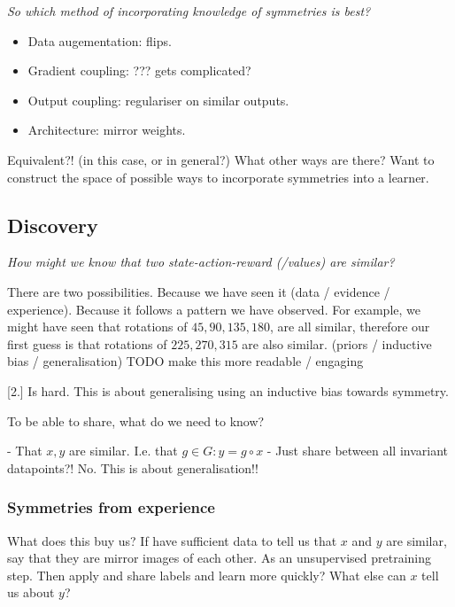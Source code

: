 \begin{displayquote}
\textit{So which method of incorporating knowledge of symmetries is best?}
\end{displayquote}

\begin{itemize}
\tightlist
  \item Data augementation: flips.
  \item Gradient coupling: ??? gets complicated?
  \item Output coupling: regulariser on similar outputs.
  \item Architecture: mirror weights.
\end{itemize}

Equivalent?! (in this case, or in general?)
What other ways are there? Want to construct the space of possible ways to incorporate symmetries into a learner.

\subsection{Discovery}

\begin{displayquote}
\textit{How might we know that two state-action-reward (/values) are similar?}
\end{displayquote}

There are two possibilities. Because we have seen it (data / evidence / experience).
Because it follows a pattern we have observed. For example, we might have seen
that rotations of $45, 90, 135, 180$, are all similar, therefore our first guess
is that rotations of $225, 270, 315$ are also similar. (priors / inductive bias / generalisation)
{\color{red} TODO make this more readable / engaging}

[2.] Is hard. This is about generalising using an inductive bias towards symmetry.

To be able to share, what do we need to know?

- That $x, y$ are similar. I.e. that $g \in G: y = g\circ x$
- Just share between all invariant datapoints?! No. This is about generalisation!!

\subsubsection{Symmetries from experience}

What does this buy us? If have sufficient data to tell us that $x$ and $y$ are
similar, say that they are mirror images of each other.
As an unsupervised pretraining step. Then apply and share labels and learn more quickly?
What else can $x$ tell us about $y$?

